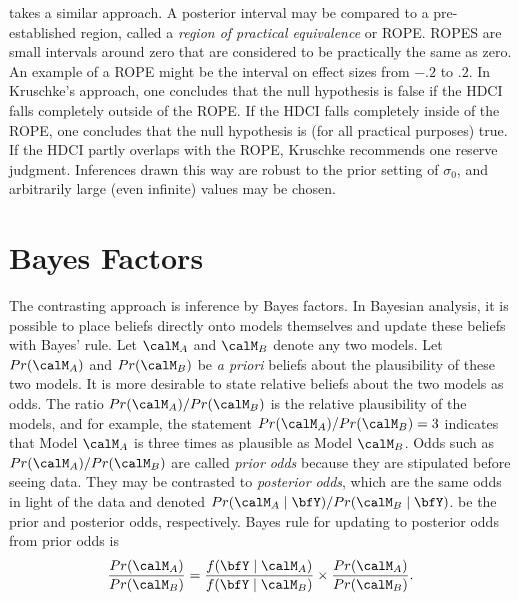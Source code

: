  takes a similar approach.  A posterior interval may be compared to a pre-established region, called a {\em region of practical equivalence} or ROPE.   ROPES are small intervals around zero that are considered to be practically the same as zero.  An example of a ROPE might be the interval on effect sizes from $-.2$ to $.2$. In Kruschke's approach, one concludes that the null hypothesis is false if the HDCI falls completely outside of the ROPE. If the HDCI falls completely inside of the ROPE, one concludes that the null hypothesis is (for all practical purposes) true.  If the HDCI partly overlaps with the ROPE, Kruschke recommends one reserve judgment.  Inferences drawn this way are robust to the prior setting of $\sigma_0$, and arbitrarily large (even infinite) values may be chosen.

\section{Bayes Factors}
The contrasting approach is inference by Bayes factors.  In Bayesian analysis, it is possible to place beliefs directly onto models themselves and update these beliefs with Bayes' rule.  Let $\calM_A$ and $\calM_B$ denote any two models.  Let $Pr(\calM_A)$ and $Pr(\calM_B)$ be {\em a priori} beliefs about the plausibility of these two models.  It is more desirable to state relative beliefs about the two models as odds.  The ratio $Pr(\calM_A)/Pr(\calM_B)$ is the relative plausibility of the models, and for example, the statement $Pr(\calM_A)/Pr(\calM_B)=3$ indicates that Model $\calM_A$ is three times as plausible as Model $\calM_B$.  Odds such as $Pr(\calM_A)/Pr(\calM_B)$ are called {\em prior odds} because they are stipulated before seeing data.  They may be contrasted to {\em posterior odds}, which are the same odds in light of the data and denoted  $Pr(\calM_A \mid \bfY)/Pr(\calM_B \mid \bfY)$. be the prior and posterior odds, respectively. Bayes rule for updating to posterior odds from prior odds is
\begin{equation}\label{eq:bf}
\frac{Pr(\calM_A)}{Pr(\calM_B)} = \frac{f(\bfY \mid \calM_A)}{f(\bfY \mid\calM_B)} \times \frac{Pr(\calM_A)}{Pr(\calM_B)}.
\end{equation}

